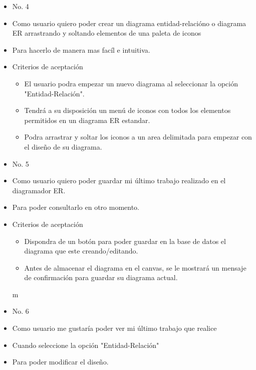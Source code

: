 \hline
\begin{itemize}
	\item No. 4
	\item Como usuario quiero poder crear un diagrama entidad-relacióno o diagrama ER arrastrando y soltando elementos de una paleta de iconos
	\item Para hacerlo de manera mas facíl e intuitiva.
	\item Criterios de aceptación
	\begin{itemize}
		\item El usuario podra empezar un nuevo diagrama al seleccionar la opción "Entidad-Relación".
		\item Tendrá a su disposición un menú de iconos con todos los elementos permitidos en un diagrama ER estandar.
		\item Podra arrastrar y soltar los iconos a un area delimitada para empezar con el diseño de su diagrama.
	\end{itemize}
\end{itemize}
\hline
\begin{itemize}
	\item No. 5
	\item Como usuario quiero poder guardar mi último trabajo realizado en el diagramador ER.
	\item Para poder consultarlo en otro momento.
	\item Criterios de aceptación
	\begin{itemize}
		\item Dispondra de un botón para poder guardar en la base de datos el diagrama que este creando/editando.
		\item Antes de almacenar el diagrama en el canvas, se le mostrará un mensaje de confirmación para guardar su diagrama actual.
	\end{itemize}m
\end{itemize}
\hline
\begin{itemize}
	\item No. 6
	\item Como usuario me gustaría poder ver mi último trabajo que realice
	\item Cuando seleccione la opción "Entidad-Relación"
	\item Para poder modificar el diseño.
\end{itemize}
\hline
